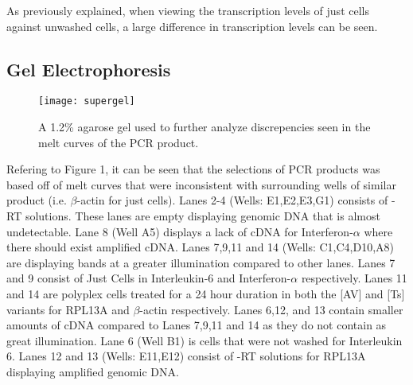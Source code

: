 \documentclass[journal, a4paper]{IEEEtran}
\begin{document}
    As previously explained, when viewing the transcription levels of just cells
    against unwashed cells, a large difference in transcription levels can be seen.

  \subsection{Gel Electrophoresis}

    \begin{figure}[t]
      \centering
      \texttt{[image: supergel]}
      \caption{A 1.2\% agarose gel used to further analyze discrepencies seen in the melt curves of the PCR product.}
      \label{fig:mesh1}
    \end{figure}

    Refering to Figure 1, it can be seen that the selections of PCR products was based off of melt curves that were inconsistent with
    surrounding wells of similar product (i.e. $\beta$-actin for just cells).
    Lanes 2-4 (Wells: E1,E2,E3,G1) consists of -RT solutions. These lanes are empty displaying
    genomic DNA that is almost undetectable. Lane 8 (Well A5) displays a lack of cDNA
    for Interferon-$\alpha$ where there should exist amplified cDNA. Lanes  7,9,11 and 14
    (Wells: C1,C4,D10,A8) are displaying bands at a greater illumination compared to other lanes.
    Lanes 7 and 9 consist of Just Cells in Interleukin-6 and Interferon-$\alpha$ respectively.
    Lanes 11 and 14 are polyplex cells treated for a 24 hour duration in both the [AV] and [Ts] variants
    for RPL13A and $\beta$-actin respectively.
    Lanes 6,12, and 13 contain smaller amounts of cDNA compared to Lanes 7,9,11 and 14 as they do not contain
    as great illumination.
    Lane 6 (Well B1) is cells that were not washed for Interleukin 6.
    Lanes 12 and 13 (Wells: E11,E12) consist of -RT solutions for RPL13A displaying amplified genomic DNA.
\end{document}
